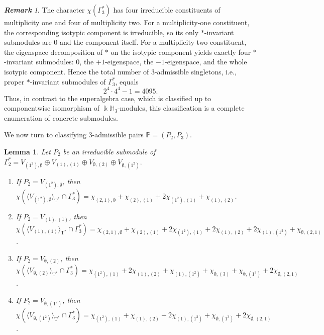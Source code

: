 \documentclass{amsart}
\newtheorem{lem}[thm]{Lemma}
\theoremstyle{definition}
\theoremstyle{remark}
\newtheorem{rmk}[thm]{\bf Remark}
\numberwithin{equation}{section}
\newcommand{\lr}[1]{\langle #1 \rangle}
\def \Ga{\Gamma}
\def \k{\Bbbk}
\def \H{\mathbb{H}}
\def \P{\mathbb{P}}
\def \T{\operatorname{T}}
\def \es{\emptyset}
\begin{document}
\begin{rmk}\label{rmk2.11}
	The character $\chi(\Ga_3^*)$ has four irreducible constituents of multiplicity one and four of multiplicity two. For a multiplicity-one constituent, the corresponding isotypic component is irreducible, so its only $*$-invariant submodules are $0$ and the component itself. For a multiplicity-two constituent, the eigenspace decomposition of $*$ on the isotypic component yields exactly four $*$-invariant submodules: $0$, the $+1$-eigenspace, the $-1$-eigenspace, and the whole isotypic component. Hence the total number of $3$-admissible singletons, i.e., proper $*$-invariant submodules of $\Ga_3^*$, equals
	\[
	2^4\cdot 4^4 - 1 = 4095.
	\]
	Thus, in contrast to the superalgebra case, which is classified up to componentwise isomorphism of $\k\H_3$-modules, this classification is a complete enumeration of concrete submodules.
\end{rmk}

	We now turn to classifying $3$-admissible pairs $\P = (P_2, P_3)$.
	
\begin{lem}\label{lem2.12}
	Let $P_2$ be an irreducible submodule of $\Ga_2^*= V_{(1^2), \es} \oplus  V_{(1),(1)} \oplus V_{\es,(2)} \oplus V_{\es,(1^2)}.$
	\begin{enumerate}
		\item[(1)]
		If $P_2=V_{(1^2), \es}$, then $\chi({\lr{V_{(1^2), \es}}_{\T^*} \cap \Ga_3^*}) = \chi_{(2,1),\es} +\chi_{(2),(1)} + 2\chi_{(1^2),(1)} + \chi_{(1),(2)}$.
		\item[(2)]
		If $P_2=V_{(1), (1)}$, then $\chi({\lr{V_{(1), (1)}}_{\T^*} \cap \Ga_3^*}) = \chi_{(2,1),\es} + \chi_{(2),(1)} + 2\chi_{(1^2),(1)} + 2\chi_{(1),(2)} + 2\chi_{(1),(1^2)} + \chi_{\es, (2,1)}$.
		\item[(3)]
		If $P_2=V_{\es, (2)}$, then $\chi({\lr{V_{\es, (2)}}_{\T^*} \cap \Ga_3^*}) = \chi_{(1^2),(1)} + 2\chi_{(1),(2)} + \chi_{(1),(1^2)} + \chi_{\es, (3)} + \chi_{\es, (1^3)} + 2\chi_{\es, (2,1)}$.
		\item[(4)]
		If $P_2=V_{\es, (1^2)}$, then $\chi({\lr{V_{\es, (1^2)}}_{\T^*} \cap \Ga_3^*}) = \chi_{(1^2),(1)} + \chi_{(1),(2)} + 2\chi_{(1),(1^2)} + \chi_{\es, (1^3)} + 2\chi_{\es, (2,1)}$.
	\end{enumerate}
\end{lem}	
	
\end{document}
